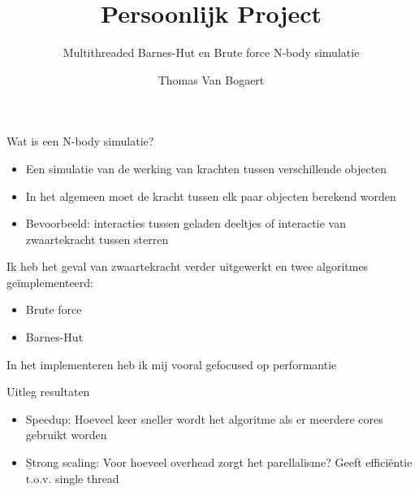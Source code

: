 \documentclass{beamer}
\title{Persoonlijk Project}
\subtitle{Multithreaded Barnes-Hut en Brute force N-body simulatie}
\author{Thomas Van Bogaert}
\date{}
\begin{document}
	
	\frame{\titlepage}
	\begin{frame}{Wat is een N-body simulatie?}
		\note{
			
		}
		\begin{itemize}
			\item Een simulatie van de werking van krachten tussen verschillende objecten
			\item In het algemeen moet de kracht tussen elk paar objecten berekend worden
			\item Bevoorbeeld: interacties tussen geladen deeltjes of interactie van zwaartekracht tussen sterren
		\end{itemize}
		
	\end{frame}
	
	\begin{frame}
			Ik heb het geval van zwaartekracht verder uitgewerkt en twee algoritmes ge\"implementeerd:
			\begin{itemize}
				\item Brute force
				\item Barnes-Hut
			\end{itemize}
			In het implementeren heb ik mij vooral gefocused op performantie
	\end{frame}
	
	\begin{frame}{Uitleg resultaten}
		\begin{itemize}
			\item Speedup: Hoeveel keer sneller wordt het algoritme als er meerdere cores gebruikt worden
			\item \b Strong scaling: Voor hoeveel overhead zorgt het parellalisme? Geeft effici\"entie t.o.v. single thread
		\end{itemize}
	\end{frame}
	
	
\end{document}
